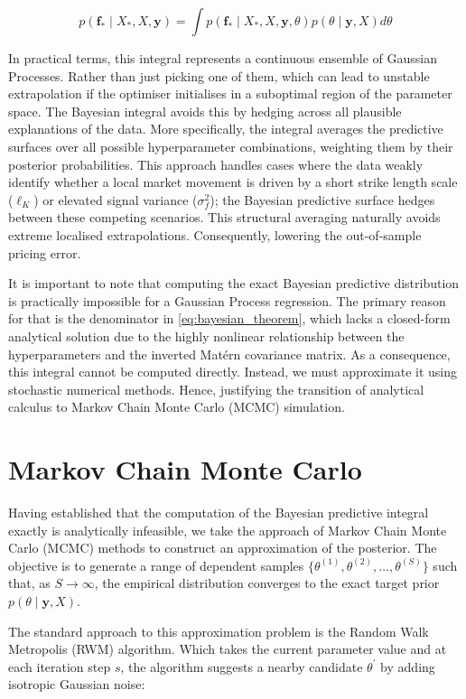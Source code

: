 \documentclass[12pt,oneside]{report}
\theoremstyle{definition}
\theoremstyle{remark}
\begin{document}
$$p(\mathbf{f}_* \mid X_*, X, \mathbf{y}) = \int p(\mathbf{f}_* \mid X_*, X, \mathbf{y}, \theta) p(\theta \mid \mathbf{y}, X) d\theta$$

In practical terms, this integral represents a continuous ensemble of Gaussian Processes. Rather than just picking one of them, which can lead to unstable extrapolation if the optimiser initialises in a suboptimal region of the parameter space. The Bayesian integral avoids this by hedging across all plausible explanations of the data. More specifically, the integral averages the predictive surfaces over all possible hyperparameter combinations, weighting them by their posterior probabilities. This approach handles cases where the data weakly identify whether a local market movement is driven by a short strike length scale ($\ell_K$) or elevated signal variance ($\sigma_f^2$); the Bayesian predictive surface hedges between these competing scenarios. This structural averaging naturally avoids extreme localised extrapolations. Consequently, lowering the out-of-sample pricing error.

It is important to note that computing the exact Bayesian predictive distribution is practically impossible for a Gaussian Process regression. The primary reason for that is the denominator in \ref{eq:bayesian_theorem}, which lacks a closed-form analytical solution due to the highly nonlinear relationship between the hyperparameters and the inverted Matérn covariance matrix. As a consequence, this integral cannot be computed directly. Instead, we must approximate it using stochastic numerical methods. Hence, justifying the transition of analytical calculus to Markov Chain Monte Carlo (MCMC) simulation.

\section{Markov Chain Monte Carlo}
Having established that the computation of the Bayesian predictive integral exactly is analytically infeasible, we take the approach of Markov Chain Monte Carlo (MCMC) methods to construct an approximation of the posterior. The objective is to generate a range of dependent samples $\{\theta^{(1)}, \theta^{(2)}, \dots, \theta^{(S)}\}$ such that, as $S \to \infty$, the empirical distribution converges to the exact target prior $p(\theta \mid \mathbf{y}, X)$.

The standard approach to this approximation problem is the Random Walk Metropolis (RWM) algorithm. Which takes the current parameter value and at each iteration step $s$, the algorithm suggests a nearby candidate $\theta^\prime$ by adding isotropic Gaussian noise:
\end{document}
